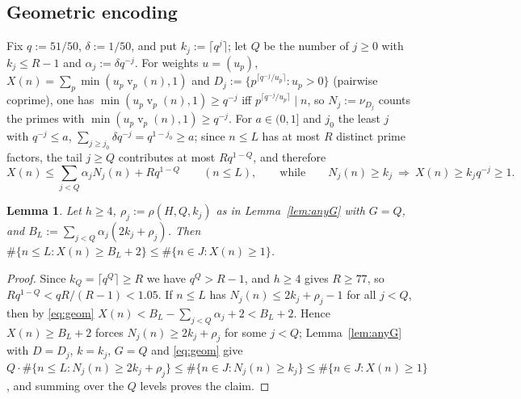 \documentclass[11pt]{article}
\newtheorem{lemma}[theorem]{Lemma}
\theoremstyle{definition}
\DeclareMathOperator{\vp}{v}
\begin{document}
\subsection*{Geometric encoding}
Fix $q:=51/50$, $\delta:=1/50$, and put $k_j:=\lceil q^j\rceil$; let $Q$ be the number of $j\ge0$ with $k_j\le R-1$ and
$\alpha_j:=\delta q^{-j}$. For weights $u=(u_p)$, $X(n)=\sum_p\min(u_p\vp_p(n),1)$ and $D_j:=\{p^{\lceil q^{-j}/u_p\rceil}:u_p>0\}$
(pairwise coprime), one has $\min(u_p\vp_p(n),1)\ge q^{-j}$ iff $p^{\lceil q^{-j}/u_p\rceil}\mid n$, so $N_j:=\nu_{D_j}$ counts the
primes with $\min(u_p\vp_p(n),1)\ge q^{-j}$. For $a\in(0,1]$ and $j_0$ the least $j$ with $q^{-j}\le a$,
$\sum_{j\ge j_0}\delta q^{-j}=q^{1-j_0}\ge a$; since $n\le L$ has at most $R$ distinct prime factors, the tail $j\ge Q$ contributes at most
$Rq^{1-Q}$, and therefore
\begin{equation}\label{eq:geom}
X(n)\le\sum_{j<Q}\alpha_jN_j(n)+Rq^{1-Q}\qquad(n\le L),\qquad\text{while}\qquad N_j(n)\ge k_j\ \Rightarrow\ X(n)\ge k_jq^{-j}\ge1.
\end{equation}

\begin{lemma}\label{lem:compare20}
Let $h\ge4$, $\rho_j:=\rho(H,Q,k_j)$ as in Lemma~\ref{lem:anyG} with $G=Q$, and $B_L:=\sum_{j<Q}\alpha_j(2k_j+\rho_j)$. Then
$\#\{n\le L:X(n)\ge B_L+2\}\le\#\{n\in J:X(n)\ge1\}$.
\end{lemma}
\begin{proof}
Since $k_Q=\lceil q^Q\rceil\ge R$ we have $q^Q>R-1$, and $h\ge4$ gives $R\ge77$, so $Rq^{1-Q}<qR/(R-1)<1.05$. If $n\le L$ has
$N_j(n)\le2k_j+\rho_j-1$ for all $j<Q$, then by \eqref{eq:geom} $X(n)<B_L-\sum_{j<Q}\alpha_j+2<B_L+2$. Hence $X(n)\ge B_L+2$ forces
$N_j(n)\ge2k_j+\rho_j$ for some $j<Q$; Lemma~\ref{lem:anyG} with $D=D_j$, $k=k_j$, $G=Q$ and \eqref{eq:geom} give
$Q\cdot\#\{n\le L:N_j(n)\ge2k_j+\rho_j\}\le\#\{n\in J:N_j(n)\ge k_j\}\le\#\{n\in J:X(n)\ge1\}$, and summing over the $Q$ levels
proves the claim.
\end{proof}
\end{document}
